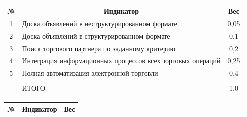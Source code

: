 \begin{itemize}
\begin{table}
\begin{center}
\tabcolsep=9pt


\begin{tabular}{|c|l|c|}


\hline


№&\multicolumn{1}{c|}{Индикатор}&Вес\\


\hline


1&Доска объявлений в неструктурированном формате&0,05\\


2&Доска объявлений в структурированном формате&0,1\hphantom{9}\\


3&Поиск торгового партнера по заданному критерию&0,2\hphantom{9}\\


4&Интеграция информационных процессов всех торговых операций&0,25\\


5&Полная автоматизация электронной торговли&0,4\hphantom{9}\\


\hline


&&\\[-10pt]


&ИТОГО&1,0\hphantom{9}\\


\hline


\end{tabular}


\end{center}






\vspace*{-12pt}


\begin{center}




\vspace*{2ex}





\begin{tabular}{|c|l|c|}


\hline


№&\multicolumn{1}{c|}{Индикатор}&Вес\\


\hline



\end{tabular}
\end{center}
\end{table}
\end{itemize}
